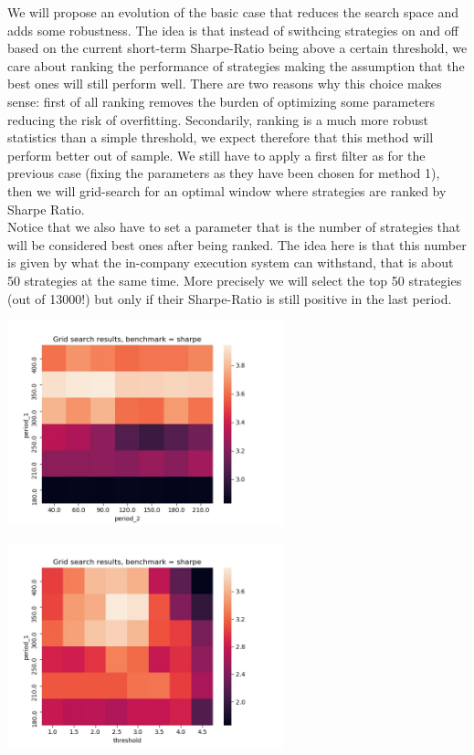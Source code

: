 We will propose an evolution of the basic case that reduces the search space and adds some robustness. The idea is that instead of swithcing strategies on and off based on the current short-term Sharpe-Ratio being above a certain threshold, we care about ranking the performance of strategies making the assumption that the best ones will still perform well. There are two reasons why this choice makes sense: first of all ranking removes the burden of optimizing some parameters reducing the risk of overfitting. Secondarily, ranking is a much more robust statistics than a simple threshold, we expect therefore that this method will perform better out of sample. We still have to apply a first filter as for the previous case (fixing the parameters as they have been chosen for method 1), then we will grid-search for an optimal window where strategies are ranked by Sharpe Ratio.\\
Notice that we also have to set a parameter that is the number of strategies that will be considered best ones after being ranked. The idea here is that this number is given by what the in-company execution system can withstand, that is about 50 strategies at the same time. More precisely we will select the top 50 strategies (out of 13000!) but only if their Sharpe-Ratio is still positive in the last period.

\begin{center}
	\centering
    \includegraphics[width=0.6\textwidth]{GridSearches/Sharpe_Ranking/Figure_1.jpeg}
	\label{Sharpe_Ranking_1}
\end{center}

\begin{center}
	\centering
	\includegraphics[width=0.6\textwidth]{GridSearches/Sharpe_Ranking/Figure_2.jpeg}
	\label{Sharpe_Ranking_2}
\end{center}

